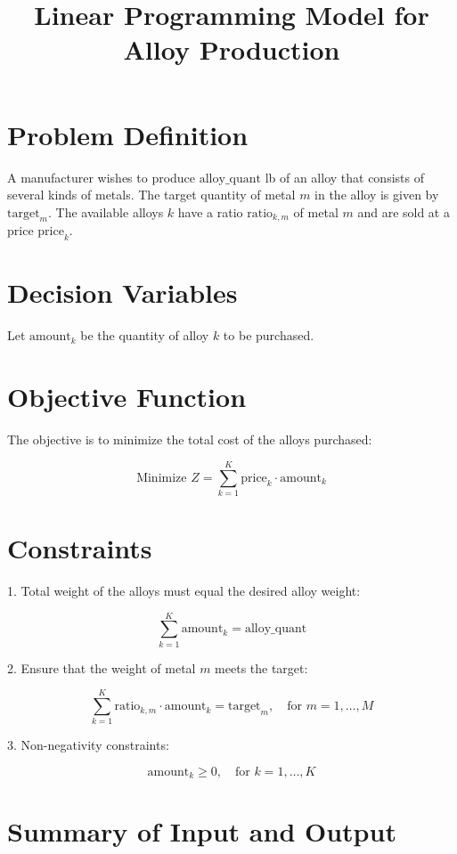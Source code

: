 \documentclass{article}
\begin{document}
\title{Linear Programming Model for Alloy Production}
\author{}
\date{}
\maketitle

\section*{Problem Definition}
A manufacturer wishes to produce \( \text{alloy\_quant} \) lb of an alloy that consists of several kinds of metals. The target quantity of metal \( m \) in the alloy is given by \( \text{target}_{m} \). The available alloys \( k \) have a ratio \( \text{ratio}_{k, m} \) of metal \( m \) and are sold at a price \( \text{price}_{k} \).

\section*{Decision Variables}
Let \( \text{amount}_{k} \) be the quantity of alloy \( k \) to be purchased.

\section*{Objective Function}
The objective is to minimize the total cost of the alloys purchased:

\[
\text{Minimize } Z = \sum_{k=1}^{K} \text{price}_{k} \cdot \text{amount}_{k}
\]

\section*{Constraints}

1. Total weight of the alloys must equal the desired alloy weight:

\[
\sum_{k=1}^{K} \text{amount}_{k} = \text{alloy\_quant}
\]

2. Ensure that the weight of metal \( m \) meets the target:

\[
\sum_{k=1}^{K} \text{ratio}_{k, m} \cdot \text{amount}_{k} = \text{target}_{m}, \quad \text{for } m = 1, \ldots, M
\]

3. Non-negativity constraints:

\[
\text{amount}_{k} \geq 0, \quad \text{for } k = 1, \ldots, K
\]

\section*{Summary of Input and Output}
\end{document}
